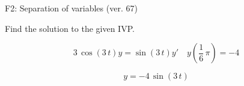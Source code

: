 \begin{exercise}
  \begin{exerciseTitle}F2: Separation of variables (ver. 67)\end{exerciseTitle}
  \begin{exerciseStatement}
    
Find the solution to the given IVP.

    
\[3 \, \cos\left(3 \, t\right) y= \sin\left(3 \, t\right) y'\hspace{1em} y\left( \frac{1}{6} \, \pi \right)= -4\]

  \end{exerciseStatement}
  \begin{exerciseAnswer}
    
\[y= -4 \, \sin\left(3 \, t\right)\]

  \end{exerciseAnswer}
\end{exercise}